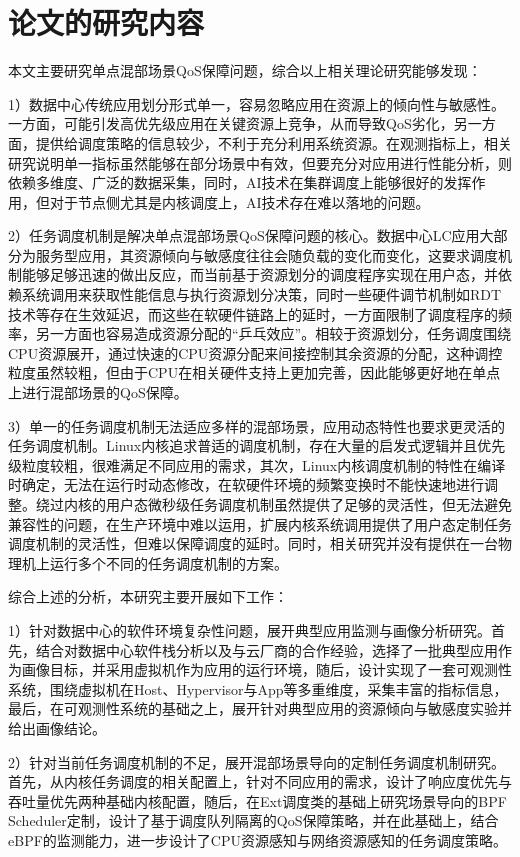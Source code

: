 \section{论文的研究内容}

本文主要研究单点混部场景QoS保障问题，综合以上相关理论研究能够发现：

1）数据中心传统应用划分形式单一，容易忽略应用在资源上的倾向性与敏感性。一方面，可能引发高优先级应用在关键资源上竞争，从而导致QoS劣化，另一方面，提供给调度策略的信息较少，不利于充分利用系统资源。在观测指标上，相关研究说明单一指标虽然能够在部分场景中有效，但要充分对应用进行性能分析，则依赖多维度、广泛的数据采集，同时，AI技术在集群调度上能够很好的发挥作用，但对于节点侧尤其是内核调度上，AI技术存在难以落地的问题。

2）任务调度机制是解决单点混部场景QoS保障问题的核心。数据中心LC应用大部分为服务型应用，其资源倾向与敏感度往往会随负载的变化而变化，这要求调度机制能够足够迅速的做出反应，而当前基于资源划分的调度程序实现在用户态，并依赖系统调用来获取性能信息与执行资源划分决策，同时一些硬件调节机制如RDT技术等存在生效延迟，而这些在软硬件链路上的延时，一方面限制了调度程序的频率，另一方面也容易造成资源分配的“乒乓效应”。相较于资源划分，任务调度围绕CPU资源展开，通过快速的CPU资源分配来间接控制其余资源的分配，这种调控粒度虽然较粗，但由于CPU在相关硬件支持上更加完善，因此能够更好地在单点上进行混部场景的QoS保障。

3）单一的任务调度机制无法适应多样的混部场景，应用动态特性也要求更灵活的任务调度机制。Linux内核追求普适的调度机制，存在大量的启发式逻辑并且优先级粒度较粗，很难满足不同应用的需求，其次，Linux内核调度机制的特性在编译时确定，无法在运行时动态修改，在软硬件环境的频繁变换时不能快速地进行调整。绕过内核的用户态微秒级任务调度机制虽然提供了足够的灵活性，但无法避免兼容性的问题，在生产环境中难以运用，扩展内核系统调用提供了用户态定制任务调度机制的灵活性，但难以保障调度的延时。同时，相关研究并没有提供在一台物理机上运行多个不同的任务调度机制的方案。

综合上述的分析，本研究主要开展如下工作：

1）针对数据中心的软件环境复杂性问题，展开典型应用监测与画像分析研究。首先，结合对数据中心软件栈分析以及与云厂商的合作经验，选择了一批典型应用作为画像目标，并采用虚拟机作为应用的运行环境，随后，设计实现了一套可观测性系统，围绕虚拟机在Host、Hypervisor与App等多重维度，采集丰富的指标信息，最后，在可观测性系统的基础之上，展开针对典型应用的资源倾向与敏感度实验并给出画像结论。

2）针对当前任务调度机制的不足，展开混部场景导向的定制任务调度机制研究。首先，从内核任务调度的相关配置上，针对不同应用的需求，设计了响应度优先与吞吐量优先两种基础内核配置，随后，在Ext调度类的基础上研究场景导向的BPF Scheduler定制，设计了基于调度队列隔离的QoS保障策略，并在此基础上，结合eBPF的监测能力，进一步设计了CPU资源感知与网络资源感知的任务调度策略。

